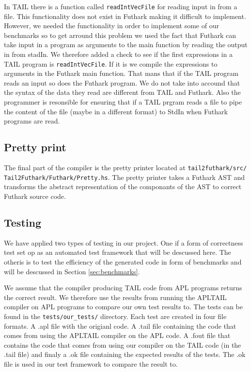 \documentclass[11pt]{article}
\begin{document}
In TAIL there is a function called {\tt readIntVecFile} for reading input in from a file. This functionality does not exist in Futhark making it difficult to implement. However, we needed the functionality in order to implement some of our benchmarks so to get arround this problem we used the fact that Futhark can take input in a program as arguments to the main function by reading the output in from stadIn. We therefore added a check to see if the first expressions in a TAIL program is {\tt readIntVecFile}. If it is we compile the expressions to arguments in the Futhark main function. That mans that if the TAIL program reads an input so does the Futhark program. We do not take into accound that the syntax of the data they read are different from TAIL and Futhark. Also the programmer is resonsible for ensuring that if a TAIL prgram reads a file to pipe the content of the file (maybe in a different format) to StdIn when Futhark programs are read. 


\subsection{Pretty print}
The final part of the compiler is the pretty printer located at {\tt tail2futhark/src/
Tail2Futhark/Futhark/Pretty.hs}. 
The pretty printer takes a Futhark AST and transforms the abstract representation of the componants of the AST to correct Futhark source code. 

\subsection{Testing}

We have applied two types of testing in our project. One if a form of correctness test set op as an automated test
framework that will be descussed here. The otheris is to test the efficiency of the generated code in form of benchmarks and will be descussed in Section \ref{sec:benchmarks}. 

We assume that the compiler producing TAIL code from APL programs returns the correct result. We therefore use the results from running the APLTAIL compiler on APL programs to compare our own test results to. 
The tests can be found in the {\tt tests/our\_tests/} directory. 
Each test are created in four file formats. 
A .apl file with the origianl code. A .tail file containing the code that comes from using the APLTAIL compiler on the APL code.
A .fout file that contains the code that comes from using our compiler on the TAIL code (in the .tail file) and finaly a .ok file containing the expected results of the tests. The .ok file is used in our test framework to compare the result to. 
\end{document}
